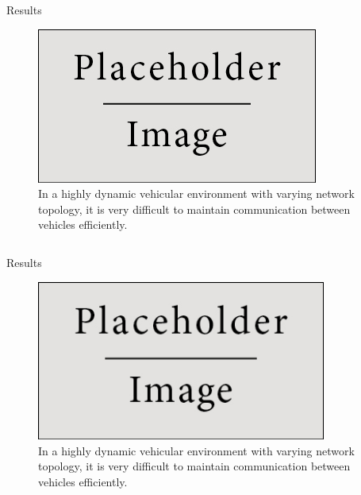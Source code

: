 \documentclass[final]{beamer}
\newlength{\onecolwid}
\newlength{\twocolwid}
\begin{document}
\begin{frame}[t]
\begin{columns}[t]
\begin{column}{\twocolwid}
\begin{alertblock}{Results}
\begin{figure}
\includegraphics[width=\textwidth,keepaspectratio]{placeholder.jpg}
\caption{In a highly dynamic vehicular environment with varying network topology, it is very difficult to maintain communication between vehicles efficiently.}
\end{figure}
\end{alertblock} 

\begin{columns}[t,totalwidth=\twocolwid] %

\begin{column}{\onecolwid}\vspace{-1in} %

\begin{block}{Results}
\begin{figure}
\centering
\includegraphics[width=0.85\textwidth,keepaspectratio]{placeholder.jpg}
\caption{In a highly dynamic vehicular environment with varying network topology, it is very difficult to maintain communication between vehicles efficiently.}
\end{figure}
\end{block}



\end{column}
\end{columns}
\end{column}
\end{columns}
\end{frame}
\end{document}
